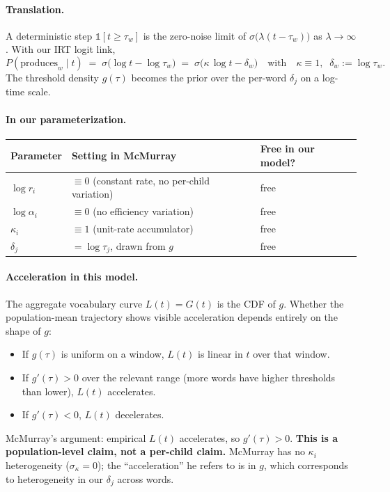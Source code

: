 \documentclass[11pt]{article}
\begin{document}
\paragraph{Translation.}
A deterministic step $\mathbb{1}[t \ge \tau_w]$ is the zero-noise
limit of $\sigma\!\big(\lambda(t - \tau_w)\big)$ as $\lambda \to \infty$.
With our IRT logit link,
\begin{equation}
P(\text{produces}_w \mid t)
\;=\;
\sigma\!\big(\log t - \log \tau_w\big)
\;=\;
\sigma\!\big(\kappa\,\log t - \delta_w\big)
\quad\text{with}\quad
\kappa \equiv 1,\;\; \delta_w := \log\tau_w.
\end{equation}
The threshold density $g(\tau)$ becomes the prior over the per-word
$\delta_j$ on a log-time scale.

\paragraph{In our parameterization.}

\begin{center}
\renewcommand{\arraystretch}{1.10}
\begin{tabular}{@{}lll@{}}
\toprule
\textbf{Parameter} & \textbf{Setting in McMurray} & \textbf{Free in our model?} \\
\midrule
$\log r_i$         & $\equiv 0$ (constant rate, no per-child variation) & free \\
$\log \alpha_i$    & $\equiv 0$ (no efficiency variation) & free \\
$\kappa_i$         & $\equiv 1$ (unit-rate accumulator) & free \\
$\delta_j$         & $= \log \tau_j$, drawn from $g$ & free \\
\bottomrule
\end{tabular}
\end{center}

\paragraph{Acceleration in this model.} The aggregate vocabulary curve
$L(t) = G(t)$ is the CDF of $g$. Whether the population-mean trajectory
shows visible acceleration depends entirely on the shape of $g$:
\begin{itemize}\setlength\itemsep{0.2em}
\item If $g(\tau)$ is uniform on a window, $L(t)$ is linear in $t$
  over that window.
\item If $g'(\tau) > 0$ over the relevant range (more words have
  higher thresholds than lower), $L(t)$ accelerates.
\item If $g'(\tau) < 0$, $L(t)$ decelerates.
\end{itemize}
McMurray's argument: empirical $L(t)$ accelerates, so $g'(\tau) > 0$.
\textbf{This is a population-level claim, not a per-child claim.}
McMurray has no $\kappa_i$ heterogeneity ($\sigma_\kappa = 0$); the
``acceleration'' he refers to is in $g$, which corresponds to
heterogeneity in our $\delta_j$ across words.
\end{document}
